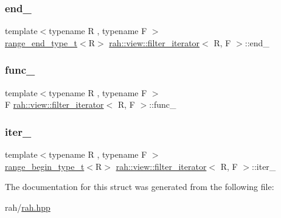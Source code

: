 \mbox{\label{structrah_1_1view_1_1filter__iterator_a69dcb1274e789cbe4074946ffe60fd7a}} 
\subsubsection{\texorpdfstring{end\_}{end\_}}
{\footnotesize\ttfamily template$<$typename R , typename F $>$ \\
\mbox{\hyperlink{namespacerah_a3042a09fc211e86eea6771d01375d263}{range\+\_\+end\+\_\+type\+\_\+t}}$<$R$>$ \mbox{\hyperlink{structrah_1_1view_1_1filter__iterator}{rah\+::view\+::filter\+\_\+iterator}}$<$ R, F $>$\+::end\+\_\+}

\mbox{\label{structrah_1_1view_1_1filter__iterator_af7b67ab1c3cb7d935e4292b4839e8435}} 
\subsubsection{\texorpdfstring{func\_}{func\_}}
{\footnotesize\ttfamily template$<$typename R , typename F $>$ \\
F \mbox{\hyperlink{structrah_1_1view_1_1filter__iterator}{rah\+::view\+::filter\+\_\+iterator}}$<$ R, F $>$\+::func\+\_\+}

\mbox{\label{structrah_1_1view_1_1filter__iterator_ad4016a695a004f72b1a942abd9193c71}} 
\subsubsection{\texorpdfstring{iter\_}{iter\_}}
{\footnotesize\ttfamily template$<$typename R , typename F $>$ \\
\mbox{\hyperlink{namespacerah_afa7f59d1f37c7b9d9caed37551be9eaa}{range\+\_\+begin\+\_\+type\+\_\+t}}$<$R$>$ \mbox{\hyperlink{structrah_1_1view_1_1filter__iterator}{rah\+::view\+::filter\+\_\+iterator}}$<$ R, F $>$\+::iter\+\_\+}



The documentation for this struct was generated from the following file\+:\begin{DoxyCompactItemize}
\item 
rah/\mbox{\hyperlink{rah_8hpp}{rah.\+hpp}}\end{DoxyCompactItemize}
